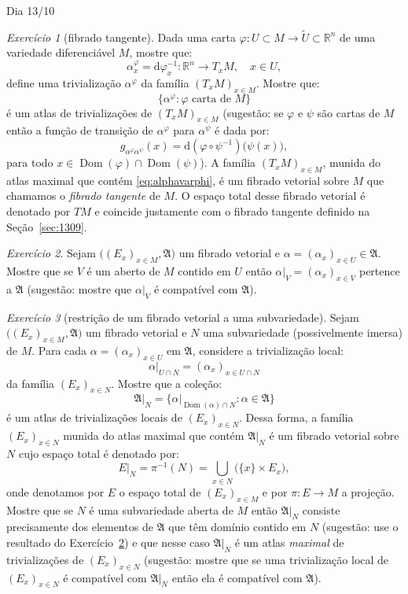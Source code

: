 \documentclass[oneside,11pt]{amsart}
\newcommand{\R}{\mathds R}
\newcommand{\dd}{\mathrm d}
\DeclareMathOperator{\Dom}{Dom}
\theoremstyle{remark}\newtheorem{exercise}{Exercício}[section]
\theoremstyle{plain}\newtheorem{teo}{Teorema}[section]
\theoremstyle{plain}\newtheorem{lem}[teo]{Lema}
\theoremstyle{plain}\newtheorem{prop}[teo]{Proposição}
\theoremstyle{definition}\newtheorem{defin}[teo]{Definição}
\theoremstyle{remark}\newtheorem{rem}[teo]{Observação}
\theoremstyle{definition}\newtheorem{example}[teo]{Exemplo}
\numberwithin{equation}{section}
\begin{document}
\begin{section}{Dia 13/10}
\begin{exercise}[fibrado tangente]
Dada uma carta $\varphi:U\subset M\to\widetilde U\subset\R^n$ de uma variedade diferenciável $M$, mostre que:
\begin{equation}\label{eq:defalphavarphi}
\alpha^\varphi_x=\dd\varphi_x^{-1}:\R^n\longrightarrow T_xM,\quad x\in U,
\end{equation}
define uma trivialização $\alpha^\varphi$ da família $(T_xM)_{x\in M}$. Mostre que:
\begin{equation}\label{eq:alphavarphi}
\big\{\alpha^\varphi:\text{$\varphi$ carta de $M$}\big\}
\end{equation}
é um atlas de trivializações de $(T_xM)_{x\in M}$ (sugestão: se $\varphi$ e $\psi$ são cartas de $M$ então a função de transição de $\alpha^\varphi$
para $\alpha^\psi$ é dada por:
\[g_{\alpha^\varphi\alpha^\psi}(x)=\dd(\varphi\circ\psi^{-1})\big(\psi(x)\big),\]
para todo $x\in\Dom(\varphi)\cap\Dom(\psi)$).
A família $(T_xM)_{x\in M}$, munida do atlas maximal que contém \eqref{eq:alphavarphi},
é um fibrado vetorial sobre $M$ que chamamos o {\em fibrado tangente\/} de $M$. O espaço total desse fibrado vetorial é denotado por $TM$
e coincide justamente com o fibrado tangente definido na Seção~\ref{sec:1309}.
\end{exercise}

\begin{exercise}\label{exe:restrtriv}
Sejam $\big((E_x)_{x\in M},\mathfrak A\big)$ um fibrado vetorial e $\alpha=(\alpha_x)_{x\in U}\in\mathfrak A$. Mostre que se $V$ é um aberto de $M$
contido em $U$ então $\alpha\vert_V=(\alpha_x)_{x\in V}$ pertence a $\mathfrak A$ (sugestão: mostre que $\alpha\vert_V$ é compatível com $\mathfrak A$).
\end{exercise}

\begin{exercise}[restrição de um fibrado vetorial a uma subvariedade]\label{exe:restrfibvet}
Sejam $\big((E_x)_{x\in M},\mathfrak A\big)$ um fibrado vetorial e $N$ uma subvariedade (possivelmente imersa) de $M$. Para cada $\alpha=(\alpha_x)_{x\in U}$
em $\mathfrak A$, considere a trivialização local:
\[\alpha\vert_{U\cap N}=(\alpha_x)_{x\in U\cap N}\]
da família $(E_x)_{x\in N}$. Mostre que a coleção:
\[\mathfrak A\vert_N=\big\{\alpha\vert_{\Dom(\alpha)\cap N}:\alpha\in\mathfrak A\big\}\]
é um atlas de trivializações locais de $(E_x)_{x\in N}$. Dessa forma, a família $(E_x)_{x\in N}$ munida do atlas maximal que contém $\mathfrak A\vert_N$
é um fibrado vetorial sobre $N$ cujo espaço total é denotado por:
\[E\vert_N=\pi^{-1}(N)=\bigcup_{x\in N}\big(\{x\}\times E_x\big),\]
onde denotamos por $E$ o espaço total de $(E_x)_{x\in M}$ e por $\pi:E\to M$ a projeção. Mostre que se $N$ é uma subvariedade aberta de $M$ então $\mathfrak A\vert_N$
consiste precisamente dos elementos de $\mathfrak A$ que têm domínio contido em $N$ (sugestão: use o resultado do Exercício~\ref{exe:restrtriv})
e que nesse caso $\mathfrak A\vert_N$ é um atlas {\em maximal\/} de trivializações de $(E_x)_{x\in N}$ (sugestão: mostre que se uma trivialização
local de $(E_x)_{x\in N}$ é compatível com $\mathfrak A\vert_N$ então ela é compatível com $\mathfrak A$).
\end{exercise}


\end{section}
\end{document}
